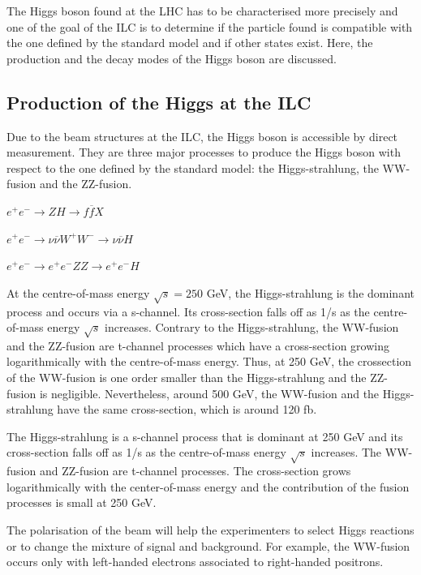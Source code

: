   The Higgs boson found at the \gls{LHC} has to be characterised more precisely and one of the goal of the \gls{ILC} is to determine if the particle found is compatible with the one defined by the standard model and if other states exist.
  Here, the production and the decay modes of the Higgs boson are discussed.

  \subsection{Production of the Higgs at the ILC}

  Due to the beam structures at the \gls{ILC}, the Higgs boson is accessible by direct measurement.
  They are three major processes to produce the Higgs boson with respect to the one defined by the standard model: the Higgs-strahlung, the WW-fusion and the ZZ-fusion.

  \begin{description}
    \centering
    \item[Higgs-strahlung:] $e^+e^- \rightarrow ZH \rightarrow f\overline{f}X$
    \item[WW-fusion:] $e^+e^- \rightarrow \nu \overline{\nu} W^+W^- \rightarrow \nu \overline{\nu} H$
    \item[ZZ-fusion:] $e^+e^- \rightarrow e^+e^- ZZ \rightarrow e^+e^- H$
  \end{description}

  At the centre-of-mass energy $\sqrt{s} = 250$ GeV, the Higgs-strahlung is the dominant process and occurs via a s-channel. 
  Its cross-section falls off as 1/s as the centre-of-mass energy $\sqrt{s}$ increases.
  Contrary to the Higgs-strahlung, the WW-fusion and the ZZ-fusion are t-channel processes which have a cross-section growing logarithmically with the centre-of-mass energy.
  Thus, at 250 GeV, the crossection of the WW-fusion is one order smaller than the Higgs-strahlung and the ZZ-fusion is negligible. 
  Nevertheless, around 500 GeV, the WW-fusion and the Higgs-strahlung have the same cross-section, which is around 120 fb.

  The Higgs-strahlung is a s-channel process that is dominant at 250 GeV and its cross-section falls off as 1/s as the centre-of-mass energy $\sqrt{s}$ increases.
  The WW-fusion and ZZ-fusion are t-channel processes. 
  The cross-section grows logarithmically with the center-of-mass energy and the contribution of the fusion processes is small at 250 GeV.

  The polarisation of the beam will help the experimenters to select Higgs reactions or to change the mixture of signal and background.
  For example, the WW-fusion occurs only with left-handed electrons associated to right-handed positrons. 
  



